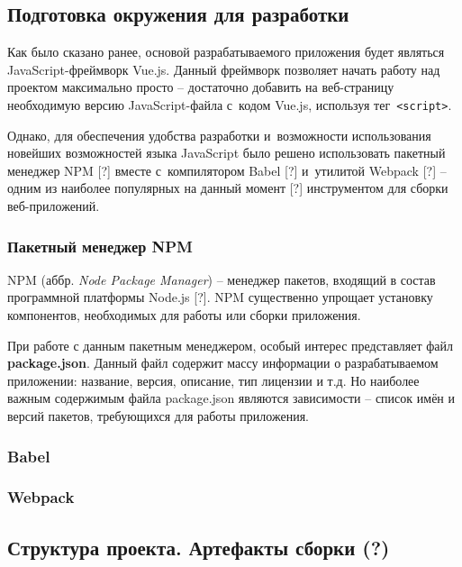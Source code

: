 
\subsection{Подготовка окружения для разработки}

Как было сказано ранее, основой разрабатываемого приложения будет являться JavaScript-фреймворк Vue.js. Данный фреймворк позволяет начать работу над проектом максимально просто -- достаточно добавить на веб-страницу необходимую версию JavaScript-файла с~кодом Vue.js, используя тег \,\verb|<script>|.

Однако, для обеспечения удобства разработки и~возможности использования новейших возможностей языка JavaScript было решено использовать пакетный менеджер NPM [?] вместе с~компилятором Babel [?] и~утилитой Webpack [?] -- одним из наиболее популярных на данный момент [?] инструментом для сборки веб-приложений.


\subsubsection{Пакетный менеджер NPM}

NPM (аббр. \emph{Node Package Manager}) -- менеджер пакетов, входящий в состав программной платформы Node.js [?]. NPM существенно упрощает установку компонентов, необходимых для работы или сборки приложения.

При работе с данным пакетным менеджером, особый интерес представляет файл \textbf{package.json}. Данный файл содержит массу информации о разрабатываемом приложении: название, версия, описание, тип лицензии и т.д. Но наиболее важным содержимым файла package.json являются зависимости -- список имён и версий пакетов, требующихся для работы приложения.


\subsubsection{Babel}


\subsubsection{Webpack}



\subsection{Структура проекта. Артефакты сборки (?)}



